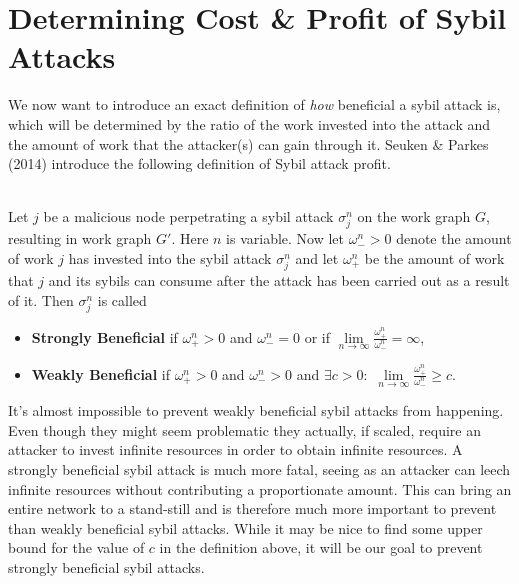 \section{Determining Cost \& Profit of Sybil Attacks}
\label{sec:Cost & Profit of Sybil Attacks}
\noindent{}We now want to introduce an exact definition of {\it how} beneficial a sybil attack is, which will be determined by the ratio of the work invested into the attack and the amount of work that the attacker(s) can gain through it. Seuken \& Parkes (2014) introduce the following definition of Sybil attack profit. \vspace{1em}\\

\begin{definition}\ \\
\label{def:Sybil Attack Benefit}
\noindent{}Let $j$ be a malicious node perpetrating a sybil attack $\sigma_j^n$ on the work graph $G$, resulting in work graph $G'$. Here $n$ is variable. Now let $\omega_{-}^{n}>0$ denote the amount of work $j$ has invested into the sybil attack $\sigma_j^n$ and let $\omega_{+}^n$ be the amount of work that $j$ and its sybils can consume after the attack has been carried out as a result of it. Then $\sigma_j^n$ is called

\begin{itemize}
\item[] {\bf Strongly Beneficial} if $\omega^n_{+}>0$ and $\omega^n_{-}=0$ or if $\lim\limits_{n\rightarrow\infty}\frac{\omega^n_{+}}{\omega^n_{-}}=\infty$,
\item[] {\bf Weakly Beneficial} if $\omega^n_{+}>0$ and $\omega^n_{-}>0$ and $\exists c>0:\,\,\lim\limits_{n\rightarrow\infty}\frac{\omega^n_{+}}{\omega^n_{-}}\geq{}c$.
\end{itemize}
\end{definition}

\noindent{}It's almost impossible to prevent weakly beneficial sybil attacks from happening. Even though they might seem problematic they actually, if scaled, require an attacker to invest infinite resources in order to obtain infinite resources. A strongly beneficial sybil attack is much more fatal, seeing as an attacker can leech infinite resources without contributing a proportionate amount. This can bring an entire network to a stand-still and is therefore much more important to prevent than weakly beneficial sybil attacks. While it may be nice to find some upper bound for the value of $c$ in the definition above, it will be our goal to prevent strongly beneficial sybil attacks. \vspace{1em}\\


